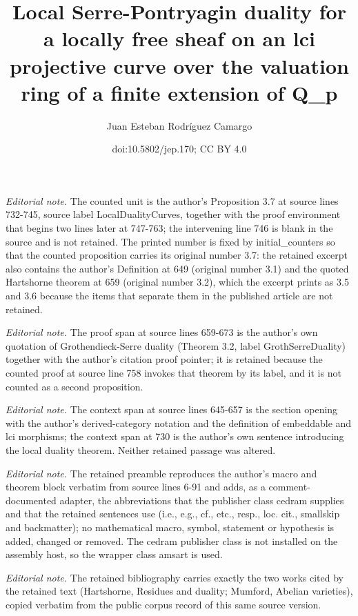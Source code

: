 \documentclass[10pt,a4paper]{amsart}
\title{Local Serre-Pontryagin duality for a locally free sheaf on an lci projective curve over the valuation ring of a finite extension of Q\_p}
\author{Juan Esteban Rodríguez Camargo}
\date{doi:10.5802/jep.170; CC BY 4.0}
\numberwithin{equation}{section}
\theoremstyle{definition}
\begin{document}
\maketitle
\setcounter{section}{3}
\setcounter{prop}{4}
\noindent\textit{Editorial note.} The counted unit is the author's Proposition 3.7 at source lines 732-745, source label LocalDualityCurves, together with the proof environment that begins two lines later at 747-763; the intervening line 746 is blank in the source and is not retained. The printed number is fixed by initial\_counters so that the counted proposition carries its original number 3.7: the retained excerpt also contains the author's Definition at 649 (original number 3.1) and the quoted Hartshorne theorem at 659 (original number 3.2), which the excerpt prints as 3.5 and 3.6 because the items that separate them in the published article are not retained.\par\medskip
\noindent\textit{Editorial note.} The proof span at source lines 659-673 is the author's own quotation of Grothendieck-Serre duality (Theorem 3.2, label GrothSerreDuality) together with the author's citation proof pointer; it is retained because the counted proof at source line 758 invokes that theorem by its label, and it is not counted as a second proposition.\par\medskip
\noindent\textit{Editorial note.} The context span at source lines 645-657 is the section opening with the author's derived-category notation and the definition of embeddable and lci morphisms; the context span at 730 is the author's own sentence introducing the local duality theorem. Neither retained passage was altered.\par\medskip
\noindent\textit{Editorial note.} The retained preamble reproduces the author's macro and theorem block verbatim from source lines 6-91 and adds, as a comment-documented adapter, the abbreviations that the publisher class cedram supplies and that the retained sentences use (i.e., e.g., cf., etc., resp., loc. cit., smallskip and backmatter); no mathematical macro, symbol, statement or hypothesis is added, changed or removed. The cedram publisher class is not installed on the assembly host, so the wrapper class amsart is used.\par\medskip
\noindent\textit{Editorial note.} The retained bibliography carries exactly the two works cited by the retained text (Hartshorne, Residues and duality; Mumford, Abelian varieties), copied verbatim from the public corpus record of this same source version.\par\medskip
\end{document}
